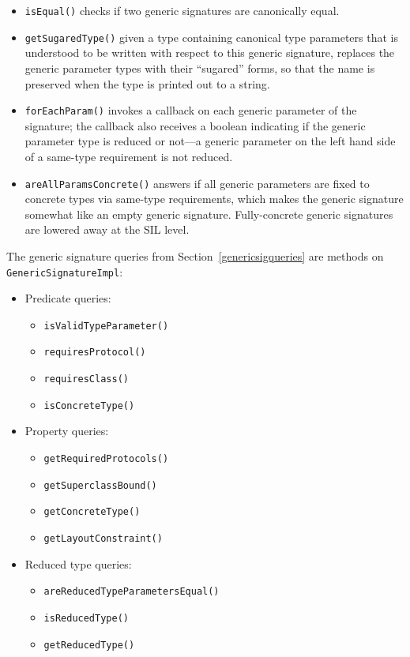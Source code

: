 \documentclass[a4paper,headsepline,bibliography=totoc,toc=flat,fleqn,twoside=semi]{scrbook}
\theoremstyle{definition}
\theoremstyle{definition}
\theoremstyle{definition}
\begin{document}
\begin{itemize}
\item \texttt{isEqual()} checks if two generic signatures are canonically equal.
\item \texttt{getSugaredType()} given a type containing canonical type parameters that is understood to be written with respect to this generic signature, replaces the generic parameter types with their ``sugared'' forms, so that the name is preserved when the type is printed out to a string.
\item \texttt{forEachParam()} invokes a callback on each generic parameter of the signature; the callback also receives a boolean indicating if the generic parameter type is reduced or not---a generic parameter on the left hand side of a same-type requirement is not reduced.
\item \texttt{areAllParamsConcrete()} answers if all generic parameters are fixed to concrete types via same-type requirements, which makes the generic signature somewhat like an empty generic signature. Fully-concrete generic signatures are lowered away at the SIL level.
\end{itemize}
The generic signature queries from Section~\ref{genericsigqueries} are methods on \texttt{GenericSignatureImpl}:
\begin{itemize}
\item Predicate queries:
\begin{itemize}
\item \texttt{isValidTypeParameter()}
\item \texttt{requiresProtocol()}
\item \texttt{requiresClass()}
\item \texttt{isConcreteType()}
\end{itemize}
\item Property queries:
\begin{itemize}
\item \texttt{getRequiredProtocols()}
\item \texttt{getSuperclassBound()}
\item \texttt{getConcreteType()}
\item \texttt{getLayoutConstraint()}
\end{itemize}
\item Reduced type queries:
\begin{itemize}
\item \texttt{areReducedTypeParametersEqual()}
\item \texttt{isReducedType()}
\item \texttt{getReducedType()}
\end{itemize}
\end{itemize}
\end{document}
